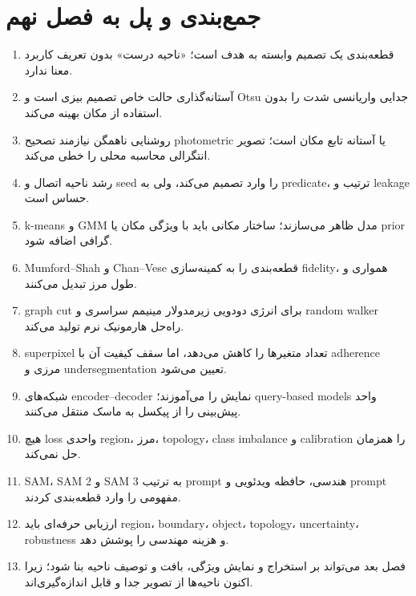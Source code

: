 \documentclass[12pt,openany,oneside]{book}
\begin{document}
\section{جمع‌بندی و پل به فصل نهم}
\begin{summarybox}
\begin{enumerate}
\item قطعه‌بندی یک تصمیم وابسته به هدف است؛ «ناحیه درست» بدون تعریف کاربرد معنا ندارد.
\item آستانه‌گذاری حالت خاص تصمیم بیزی است و Otsu جدایی واریانسی شدت را بدون استفاده از مکان بهینه می‌کند.
\item روشنایی ناهمگن نیازمند تصحیح photometric یا آستانه تابع مکان است؛ تصویر انتگرالی محاسبه محلی را خطی می‌کند.
\item رشد ناحیه اتصال و seed را وارد تصمیم می‌کند، ولی به predicate، ترتیب و leakage حساس است.
\item k-means و GMM مدل ظاهر می‌سازند؛ ساختار مکانی باید با ویژگی مکان یا prior گرافی اضافه شود.
\item Mumford--Shah و Chan--Vese قطعه‌بندی را به کمینه‌سازی fidelity، همواری و طول مرز تبدیل می‌کنند.
\item graph cut برای انرژی دودویی زیرمدولار مینیمم سراسری و random walker راه‌حل هارمونیک نرم تولید می‌کند.
\item superpixel تعداد متغیرها را کاهش می‌دهد، اما سقف کیفیت آن با adherence مرزی و undersegmentation تعیین می‌شود.
\item شبکه‌های encoder--decoder نمایش را می‌آموزند؛ query-based models واحد پیش‌بینی را از پیکسل به ماسک منتقل می‌کنند.
\item هیچ loss واحدی region، مرز، topology، class imbalance و calibration را همزمان حل نمی‌کند.
\item SAM، SAM 2 و SAM 3 به ترتیب prompt هندسی، حافظه ویدئویی و prompt مفهومی را وارد قطعه‌بندی کردند.
\item ارزیابی حرفه‌ای باید region، boundary، object، topology، uncertainty، robustness و هزینه مهندسی را پوشش دهد.
\item فصل بعد می‌تواند بر استخراج و نمایش ویژگی، بافت و توصیف ناحیه بنا شود؛ زیرا اکنون ناحیه‌ها از تصویر جدا و قابل اندازه‌گیری‌اند.
\end{enumerate}
\end{summarybox}
\end{document}
